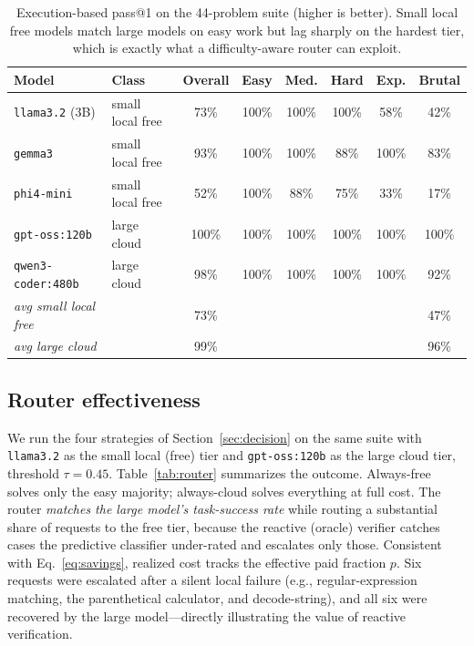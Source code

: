 \documentclass[11pt]{article}
\begin{document}
\begin{table}[t]
\centering
\small
\caption{Execution-based pass@1 on the 44-problem suite (higher is better).
Small local free models match large models on easy work but lag sharply on the
hardest tier, which is exactly what a difficulty-aware router can exploit.}
\label{tab:bench}
\begin{tabular}{@{}llcccccc@{}}
\toprule
Model & Class & Overall & Easy & Med. & Hard & Exp. & Brutal \\
\midrule
\texttt{llama3.2} (3B)      & small local free & 73\% & 100\% & 100\% & 100\% & 58\%  & 42\%  \\
\texttt{gemma3}             & small local free & 93\% & 100\% & 100\% & 88\%  & 100\% & 83\%  \\
\texttt{phi4-mini}          & small local free & 52\% & 100\% & 88\%  & 75\%  & 33\%  & 17\%  \\
\midrule
\texttt{gpt-oss:120b}       & large cloud      & 100\%& 100\% & 100\% & 100\% & 100\% & 100\% \\
\texttt{qwen3-coder:480b}   & large cloud      & 98\% & 100\% & 100\% & 100\% & 100\% & 92\%  \\
\midrule
\emph{avg small local free} &                  & 73\% &       &       &       &       & 47\%  \\
\emph{avg large cloud}      &                  & 99\% &       &       &       &       & 96\%  \\
\bottomrule
\end{tabular}
\end{table}

\subsection{Router effectiveness}
\label{sec:router-results}
We run the four strategies of Section~\ref{sec:decision} on the same suite with
\texttt{llama3.2} as the small local (free) tier and \texttt{gpt-oss:120b} as the
large cloud tier, threshold $\tau{=}0.45$.
Table~\ref{tab:router} summarizes the outcome. Always-free solves only the easy
majority; always-cloud solves everything at full cost. The router
\emph{matches the large model's task-success rate} while routing a substantial
share of requests to the free tier, because the reactive (oracle) verifier
catches cases the predictive classifier under-rated and escalates only those.
Consistent with Eq.~\eqref{eq:savings}, realized cost tracks the effective
paid fraction $p$. Six requests were escalated after a silent local failure
(e.g., regular-expression matching, the parenthetical calculator, and
decode-string), and all six were recovered by the large model---directly
illustrating the value of reactive verification.
\end{document}
